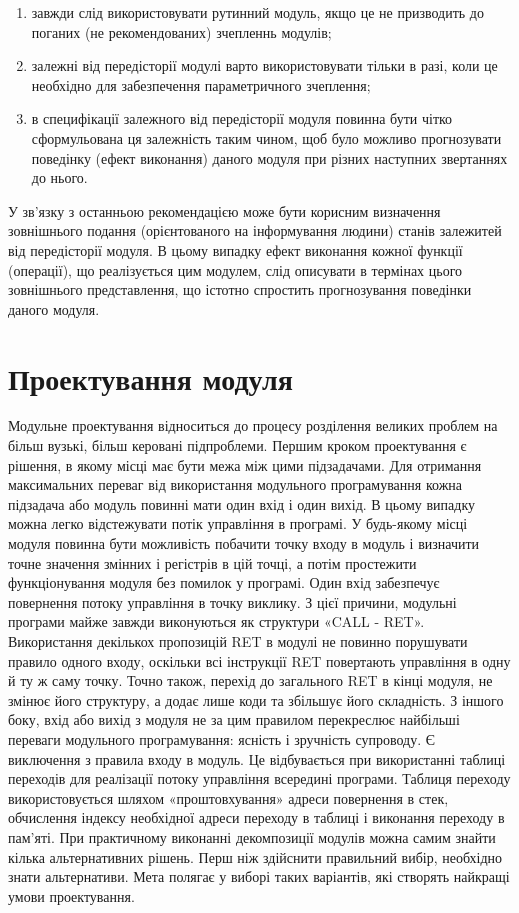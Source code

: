 \documentclass[a4paper,14pt, titlepage]{article}
\begin{document}
\begin{enumerate}
    \item завжди
    слід використовувати рутинний модуль, якщо це не призводить до поганих
    (не рекомендованих) зчепленнь модулів;
    \item залежні від передісторії модулі
    варто використовувати тільки в разі, коли це необхідно для забезпечення
    параметричного зчеплення;
    \item в специфікації залежного від передісторії
    модуля повинна бути чітко сформульована ця залежність таким чином, щоб
    було можливо прогнозувати поведінку (ефект виконання) даного модуля при
    різних наступних звертаннях до нього.
\end{enumerate}

У зв'язку з останньою рекомендацією може бути корисним визначення
зовнішнього подання (орієнтованого на інформування людини) станів
залежитей від передісторії модуля. В цьому випадку ефект виконання кожної
функції (операції), що реалізується цим модулем, слід описувати в
термінах цього зовнішнього представлення, що істотно спростить
прогнозування поведінки даного модуля.

\section{Проектування модуля}

Модульне проектування відноситься до процесу розділення великих
проблем на більш вузькі, більш керовані підпроблеми. Першим кроком
проектування є рішення, в якому місці має бути межа між цими
підзадачами. Для отримання максимальних переваг від використання
модульного програмування кожна підзадача або модуль повинні мати один
вхід і один вихід. В цьому випадку можна легко відстежувати потік
управління в програмі. У будь-якому місці модуля повинна бути можливість
побачити точку входу в модуль і визначити точне значення змінних і
регістрів в цій точці, а потім простежити функціонування модуля без
помилок у програмі. Один вхід забезпечує повернення потоку
управління в точку виклику. З цієї причини, модульні програми майже
завжди виконуються як структури «CALL - RET». Використання декількох
пропозицій RET в модулі не повинно порушувати правило одного входу,
оскільки всі інструкції RET повертають управління в одну й ту ж саму
точку. Точно також, перехід до загального RET в кінці модуля, не змінює
його структуру, а додає лише коди та збільшує його складність. З іншого
боку, вхід або вихід з модуля не за цим правилом перекреслює найбільші
переваги модульного програмування: ясність і зручність супроводу. Є
виключення з правила входу в модуль. Це відбувається при використанні
таблиці переходів для реалізації потоку управління всередині програми.
Таблиця переходу використовується шляхом «проштовхування» адреси
повернення в стек, обчислення індексу необхідної адреси переходу в
таблиці і виконання переходу в пам'яті. При практичному виконанні
декомпозиції модулів можна самим знайти кілька альтернативних рішень.
Перш ніж здійснити правильний вибір, необхідно знати альтернативи. Мета
полягає у виборі таких варіантів, які створять найкращі умови
проектування.
\end{document}
